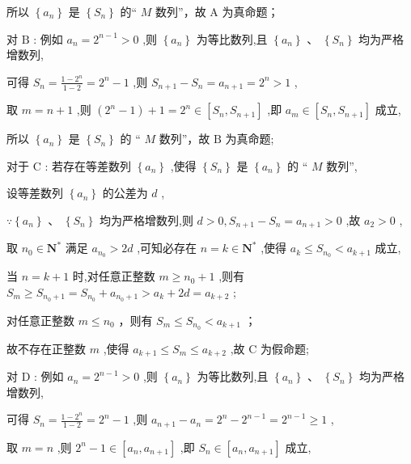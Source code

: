 \documentclass[10pt]{article}
\begin{document}
所以 \(\left\{  {a}_{n}\right\}\) 是 \(\left\{  {S}_{n}\right\}\) 的“ \(M\) 数列”，故 \(\mathrm{A}\) 为真命题；

对 \(\mathrm{B}\) : 例如 \({a}_{n} = {2}^{n - 1} > 0\) ,则 \(\left\{  {a}_{n}\right\}\) 为等比数列,且 \(\left\{  {a}_{n}\right\}  \text{ 、 }\left\{  {S}_{n}\right\}\) 均为严格增数列,

可得 \({S}_{n} = \frac{1 - {2}^{n}}{1 - 2} = {2}^{n} - 1\) ,则 \({S}_{n + 1} - {S}_{n} = {a}_{n + 1} = {2}^{n} > 1\) ,

取 \(m = n + 1\) ,则 \(\left( {{2}^{n} - 1}\right)  + 1 = {2}^{n} \in  \left\lbrack  {{S}_{n},{S}_{n + 1}}\right\rbrack\) ,即 \({a}_{m} \in  \left\lbrack  {{S}_{n},{S}_{n + 1}}\right\rbrack\) 成立,

所以 \(\left\{  {a}_{n}\right\}\) 是 \(\left\{  {S}_{n}\right\}\) 的 “ \(M\) 数列”，故 \(\mathrm{B}\) 为真命题;

对于 \(\mathrm{C}\) : 若存在等差数列 \(\left\{  {a}_{n}\right\}\) ,使得 \(\left\{  {S}_{n}\right\}\) 是 \(\left\{  {a}_{n}\right\}\) 的 “ \(M\) 数列”,

设等差数列 \(\left\{  {a}_{n}\right\}\) 的公差为 \(d\) ,

\(\because \left\{  {a}_{n}\right\}  \text{ 、 }\left\{  {S}_{n}\right\}\) 均为严格增数列,则 \(d > 0,{S}_{n + 1} - {S}_{n} = {a}_{n + 1} > 0\) ,故 \({a}_{2} > 0\) ,

取 \({n}_{0} \in  {\mathbf{N}}^{ * }\) 满足 \({a}_{{n}_{0}} > {2d}\) ,可知必存在 \(n = k \in  {\mathbf{N}}^{ * }\) ,使得 \({a}_{k} \leq  {S}_{{n}_{0}} < {a}_{k + 1}\) 成立,

当 \(n = k + 1\) 时,对任意正整数 \(m \geq  {n}_{0} + 1\) ,则有 \({S}_{m} \geq  {S}_{{n}_{0} + 1} = {S}_{{n}_{0}} + {a}_{{n}_{0} + 1} > {a}_{k} + {2d} = {a}_{k + 2}\) ;

对任意正整数 \(m \leq  {n}_{0}\) ，则有 \({S}_{m} \leq  {S}_{{n}_{0}} < {a}_{k + 1}\) ；

故不存在正整数 \(m\) ,使得 \({a}_{k + 1} \leq  {S}_{m} \leq  {a}_{k + 2}\) ,故 \(\mathrm{C}\) 为假命题;

对 \(\mathrm{D}\) : 例如 \({a}_{n} = {2}^{n - 1} > 0\) ,则 \(\left\{  {a}_{n}\right\}\) 为等比数列,且 \(\left\{  {a}_{n}\right\}  \text{ 、 }\left\{  {S}_{n}\right\}\) 均为严格增数列,

可得 \({S}_{n} = \frac{1 - {2}^{n}}{1 - 2} = {2}^{n} - 1\) ,则 \({a}_{n + 1} - {a}_{n} = {2}^{n} - {2}^{n - 1} = {2}^{n - 1} \geq  1\) ,

取 \(m = n\) ,则 \({2}^{n} - 1 \in  \left\lbrack  {{a}_{n},{a}_{n + 1}}\right\rbrack\) ,即 \({S}_{n} \in  \left\lbrack  {{a}_{n},{a}_{n + 1}}\right\rbrack\) 成立,
\end{document}
